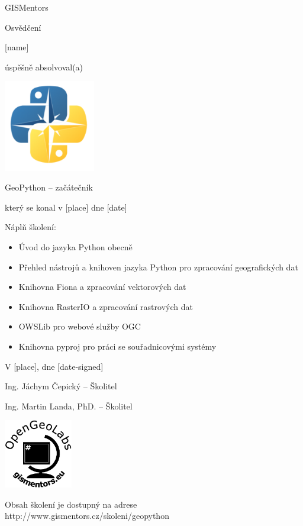 \documentclass[12pt, a4paper]{letter}
\begin{document}
\pagestyle{empty}
\begin{center}

{\Large GISMentors}

{\Huge Osvědčení}

{\Large [name]}

úspěšně absolvoval(a)

\includegraphics[width=0.30\textwidth]{../images/geopython.png}

{\Large GeoPython -- začátečník}

který se konal v [place] dne [date]
\end{center}

Náplň školení:

\begin{itemize}
    \item Úvod do jazyka Python obecně
    \item Přehled nástrojů a knihoven jazyka Python pro zpracování geografických dat
    \item Knihovna Fiona a zpracování vektorových dat
    \item Knihovna RasterIO a zpracování rastrových dat
    \item OWSLib pro webové služby OGC
    \item Knihovna pyproj pro práci se souřadnicovými systémy
\end{itemize}

\vfill
\parbox{7cm}{

    V [place], dne [date-signed]\\

\vfill

    Ing. Jáchym Čepický -- Školitel \\

\vfill

    Ing. Martin Landa, PhD. -- Školitel
}
\hfill
\parbox{3cm}{
    \includegraphics[width=3cm]{../images/placka.eps}
}

\vfill

\begin{center}
{\footnotesize Obsah školení je dostupný na adrese
http://www.gismentors.cz/skoleni/geopython}
\end{center}
\end{document}
